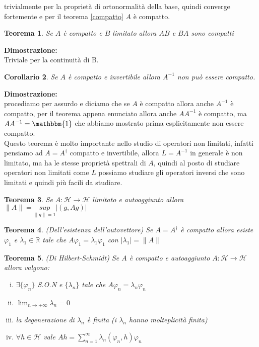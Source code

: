 \documentclass[12pt]{book}
\theoremstyle{plain}
\newcommand{\R}{\mathbb{R}}
\renewcommand{\H}{\mathcal{H}}
\newtheorem{thm}{Teorema}[section]
\newtheorem{coro}[thm]{Corollario}
\theoremstyle{definition}
\theoremstyle{remark}
\begin{document}
trivialmente per la proprietà di ortonormalità della base, quindi converge fortemente e per il teorema \eqref{compatto} $A$ è compatto.
\begin{thm}
Se $A$ è compatto e $B$ limitato allora $AB$ e $BA$ sono compatti
\end{thm}
\hspace{-1.6em}\textbf{Dimostrazione:}\\
Triviale per la continuità di B.
\begin{coro}
\label{inversocompatto}
Se $A$ è compatto e invertibile allora $A^{-1}$ non può essere compatto.
\end{coro}
\hspace{-1.6em}\textbf{Dimostrazione:}\\
procediamo per assurdo e diciamo che se $A$ è compatto allora anche $A^{-1}$ è compatto, per il teorema appena enunciato allora anche $AA^{-1}$ è compatto, ma $AA^{-1}=\mathbbm{1}$ che abbiamo mostrato prima esplicitamente non essere compatto.\\
\newline Questo teorema è molto importante nello studio di operatori non limitati, infatti pensiamo ad $A=A^\dagger$ compatto e invertibile, allora $L = A^{-1}$ in generale è non limitato, ma ha le stesse proprietà spettrali di $A$, quindi al posto di studiare operatori non limitati come $L$ possiamo studiare gli operatori inversi che sono limitati e quindi più facili da studiare.
\begin{thm}
Se $A:\H\to\H$ limitato e autoaggiunto allora $\|A\| = \underset{\|g\|=1}{sup}|(g,Ag)|$
\end{thm}
\begin{thm}(Dell'esistenza dell'autovettore)
Se $A=A^\dagger$ è compatto allora esiste $\varphi_1$ e $\lambda_1\in\R$ tale che $A\varphi_1 = \lambda_1\varphi_1$ con $|\lambda_1| = \|A\|$
\end{thm}
\begin{thm}(Di Hilbert-Schmidt)
Se $A$ è compatto e autoaggiunto $A:\H\to\H$ allora valgono:
\begin{enumerate}[i.]
\item $\exists \{\varphi_n\}$ S.O.N e $\{\lambda_n\}$ tale che $A\varphi_n = \lambda_n \varphi_n$
\item $\displaystyle \lim_{n\to +\infty} \lambda_n = 0$
\item la degenerazione di $\lambda_n$ è finita (i $\lambda_n$ hanno molteplicità finita)
\item $\forall h\in\H$ vale $Ah = \displaystyle\sum_{n=1}^{\infty}\lambda_n (\varphi_n,h)\varphi_n$
\end{enumerate}
\end{thm}
\end{document}
